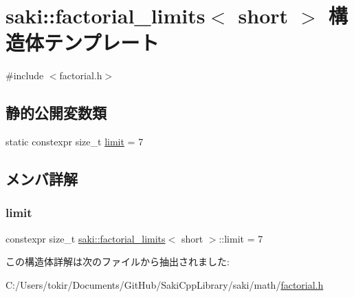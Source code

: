 \hypertarget{structsaki_1_1factorial__limits_3_01short_01_4}{}\section{saki\+:\+:factorial\+\_\+limits$<$ short $>$ 構造体テンプレート}
\label{structsaki_1_1factorial__limits_3_01short_01_4}


{\ttfamily \#include $<$factorial.\+h$>$}

\subsection*{静的公開変数類}
\begin{DoxyCompactItemize}
\item 
static constexpr size\+\_\+t \mbox{\hyperlink{structsaki_1_1factorial__limits_3_01short_01_4_a62875bf3dcd307db490ce8ef8e693375}{limit}} = 7
\end{DoxyCompactItemize}


\subsection{メンバ詳解}
\mbox{\label{structsaki_1_1factorial__limits_3_01short_01_4_a62875bf3dcd307db490ce8ef8e693375}} 
\subsubsection{\texorpdfstring{limit}{limit}}
{\footnotesize\ttfamily constexpr size\+\_\+t \mbox{\hyperlink{structsaki_1_1factorial__limits}{saki\+::factorial\+\_\+limits}}$<$ short $>$\+::limit = 7\hspace{0.3cm}{\ttfamily [static]}}



この構造体詳解は次のファイルから抽出されました\+:\begin{DoxyCompactItemize}
\item 
C\+:/\+Users/tokir/\+Documents/\+Git\+Hub/\+Saki\+Cpp\+Library/saki/math/\mbox{\hyperlink{factorial_8h}{factorial.\+h}}\end{DoxyCompactItemize}
